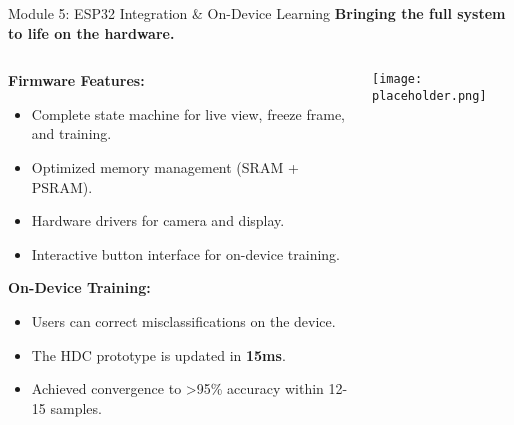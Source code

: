 \documentclass{beamer}
\begin{document}
\begin{frame}{Module 5: ESP32 Integration & On-Device Learning}
    \textbf{Bringing the full system to life on the hardware.}
    \begin{columns}
        \begin{column}{0.5\textwidth}
            \textbf{Firmware Features:}
            \begin{itemize}
                \item Complete state machine for live view, freeze frame, and training.
                \item Optimized memory management (SRAM + PSRAM).
                \item Hardware drivers for camera and display.
                \item Interactive button interface for on-device training.
            \end{itemize}
            \textbf{On-Device Training:}
            \begin{itemize}
                \item Users can correct misclassifications on the device.
                \item The HDC prototype is updated in \textbf{15ms}.
                \item Achieved convergence to >95\% accuracy within 12-15 samples.
            \end{itemize}
        \end{column}
        \begin{column}{0.5\textwidth}
            \texttt{[image: placeholder.png]} %
            \caption{The on-device training selection menu.}
        \end{column}
    \end{columns}
\end{frame}
\end{document}
